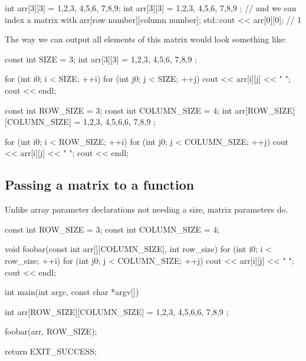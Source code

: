 \documentclass{report}
\begin{document}
    \begin{cppcode}
int arr[3][3] = {{1,2,3}, {4,5,6}, {7,8,9}};
int arr[3][3] = {
                {1,2,3},
                {4,5,6},
                {7,8,9}
            };
// and we can index a matrix with
arr[row number][column number];
std::cout << arr[0][0];  // 1
    \end{cppcode}
    \bigbreak \noindent 
    The way we can output all elements of this matrix would look something like:
    \bigbreak \noindent 
    \begin{minipage}[t]{0.47\textwidth}
    \bigbreak \noindent 
    
    \begin{cppcode}

    const int SIZE = 3;
    int arr[3][3] = {
                {1,2,3},
                {4,5,6},
                {7,8,9}
            };

    for (int i{0}; i < SIZE; ++i) {
        for (int j{0}; j < SIZE; ++j) {
            cout << arr[i][j] << " ";
        } 
        cout << endl;
    }
    \end{cppcode}
    \end{minipage}
    \hspace{0.2in} 
    \begin{minipage}[t]{0.47\textwidth}
\bigbreak \noindent 
\begin{cppcode}
    const int ROW_SIZE = 3;
    const int COLUMN_SIZE = 4;
    int arr[ROW_SIZE][COLUMN_SIZE] = {
                {1,2,3},
                {4,5,6,6},
                {7,8,9}
            };

    for (int i{0}; i < ROW_SIZE; ++i) {
        for (int j{0}; j < COLUMN_SIZE; ++j) {
            cout << arr[i][j] << " ";
        } 
        cout << endl;
    }
\end{cppcode}
    \end{minipage}
    \bigbreak \noindent 
    

    \pagebreak
    \subsection{Passing a matrix to a function}
    \bigbreak \noindent 
    Unlike array parameter declarations not needing a size, matrix parameters do.
    \bigbreak \noindent 
    
    \begin{cppcode}
const int ROW_SIZE = 3;
const int COLUMN_SIZE = 4;

void foobar(const int arr[][COLUMN_SIZE], int row_size) {
    for (int i{0}; i < row_size; ++i) {
        for (int j{0}; j < COLUMN_SIZE; ++j) {
            cout << arr[i][j] << " ";
        }
        cout << endl;
    }
}

int main(int argc, const char *argv[]) {


    int arr[ROW_SIZE][COLUMN_SIZE] = {
                {1,2,3},
                {4,5,6,6},
                {7,8,9}
            };

    foobar(arr, ROW_SIZE);

    return EXIT_SUCCESS;
}
    \end{cppcode}
    
\end{document}
